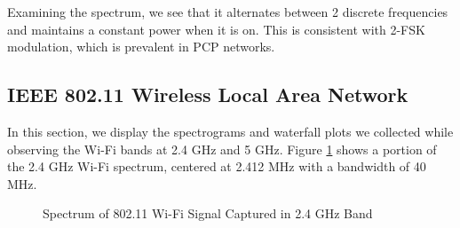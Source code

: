 \documentclass{article}
\begin{document}
Examining the spectrum, we see that it alternates between 2 discrete frequencies and maintains a constant power when it is on. This is consistent with 2-FSK modulation, which is prevalent in PCP networks.




\subsection{IEEE 802.11 Wireless Local Area Network}

In this section, we display the spectrograms and waterfall plots we collected while observing the Wi-Fi bands at 2.4 GHz and 5 GHz. Figure \ref{fig::2_412_wifi_spectrum} shows a portion of the 2.4 GHz Wi-Fi spectrum, centered at 2.412 MHz with a bandwidth of 40 MHz.

\begin{figure}[H]
	\centerline{}
	\caption{Spectrum of 802.11 Wi-Fi Signal Captured in 2.4 GHz Band}
	\label{fig::2_412_wifi_spectrum}
\end{figure}
\end{document}
